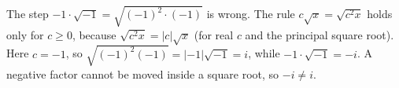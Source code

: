 The step $-1\cdot\sqrt{-1}=\sqrt{(-1)^2\cdot(-1)}$ is wrong. The rule $c\sqrt x=\sqrt{c^2x}$ holds only for $c\ge0$, because $\sqrt{c^2x}=|c|\sqrt x$ (for real $c$ and the principal square root). Here $c=-1$, so $\sqrt{(-1)^2(-1)}=|-1|\sqrt{-1}=i$, while $-1\cdot\sqrt{-1}=-i$. A negative factor cannot be moved inside a square root, so $-i\ne i$.

